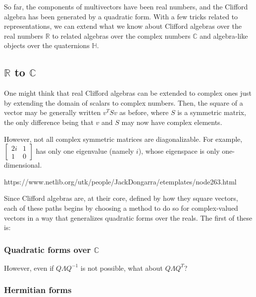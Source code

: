 \documentclass{article}
\begin{document}
So far, the components of multivectors have been real numbers,
and the Clifford algebra has been generated by a quadratic form.
With a few tricks related to representations, we can extend what we know
about Clifford algebras over the real numbers $\mathbb{R}$
to related algebras over the complex numbers $\mathbb{C}$
and algebra-like objects over the quaternions $\mathbb{H}$.

\subsection{\texorpdfstring{$\mathbb{R}$}{R} to \texorpdfstring{$\mathbb{C}$}{C}}

One might think that real Clifford algebras can be extended to complex ones
just by extending the domain of scalars to complex numbers.
Then, the square of a vector may be generally written $v^TSv$ as before,
where $S$ is a symmetric matrix,
the only difference being that $v$ and $S$ may now have complex elements.

However, not all complex symmetric matrices are diagonalizable.
For example,$
\begin{bmatrix}
  2i & 1 \\
  1 & 0
\end{bmatrix}$
has only one eigenvalue (namely $i$),
whose eigenspace is only one-dimensional.

https://www.netlib.org/utk/people/JackDongarra/etemplates/node263.html

Since Clifford algebras are, at their core, defined by how they square vectors,
each of these paths begins by choosing a method to do so for complex-valued vectors
in a way that generalizes quadratic forms over the reals.
The first of these is:

\subsubsection{Quadratic forms over \texorpdfstring{$\mathbb{C}$}{C}}

However, even if $Q \Lambda Q^{-1}$ is not possible,
what about $Q \Lambda Q^T$?

\subsubsection{Hermitian forms}
\end{document}

